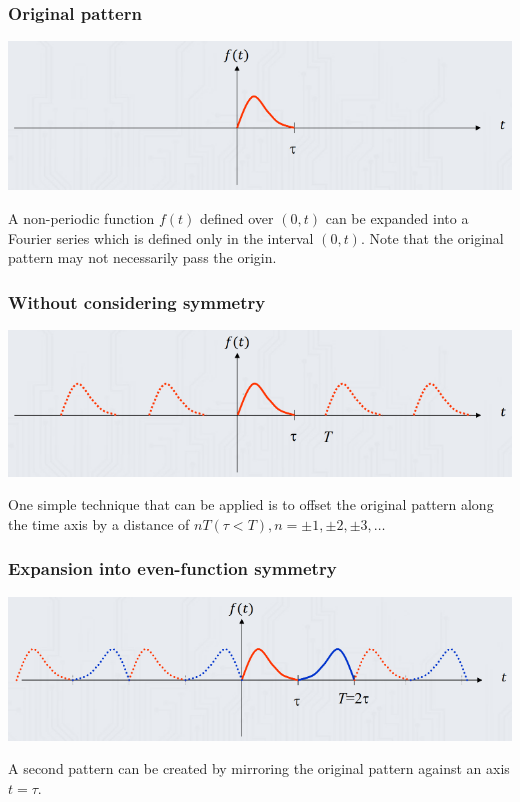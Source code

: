 \documentclass[11pt]{article}
\begin{document}
\subsubsection{Original pattern}
\label{sec:org3678c69}
\begin{center}
\includegraphics[width=.9\linewidth]{./images/original-pattern.png}
\end{center}
A non-periodic function \(f(t)\) defined over \((0, t)\) can be expanded into a Fourier series which is defined only in the interval \((0, t)\). Note that the original pattern may not necessarily pass the origin.
\subsubsection{Without considering symmetry}
\label{sec:orge39b1e7}
\begin{center}
\includegraphics[width=.9\linewidth]{./images/non-symmetric-repeated-pattern.png}
\end{center}
One simple technique that can be applied is to offset the original pattern along the time axis by a distance of \(nT (\tau < T), n = \pm 1, \pm 2, \pm 3, \ldots\)

 \newpage
\subsubsection{Expansion into even-function symmetry}
\label{sec:org627caca}
\begin{center}
\includegraphics[width=.9\linewidth]{./images/even-function-symmetry-repeated-pattern.png}
\end{center}
A second pattern can be created by mirroring the original pattern against an axis \(t = \tau\).
\end{document}
